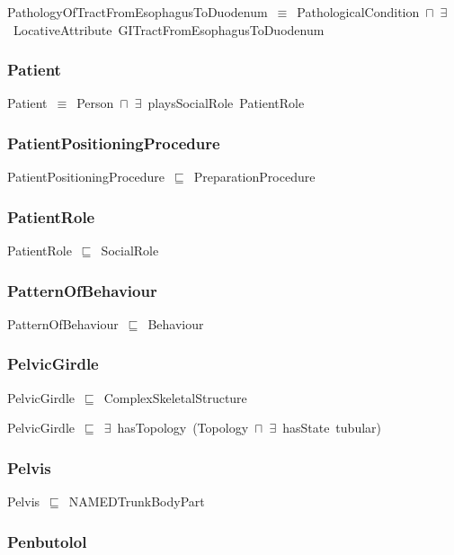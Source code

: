\documentclass{article}
\begin{document}
PathologyOfTractFromEsophagusToDuodenum~\ensuremath{\equiv}~PathologicalCondition~\ensuremath{\sqcap}~\ensuremath{\exists}~LocativeAttribute~GITractFromEsophagusToDuodenum

\subsubsection*{Patient}

Patient~\ensuremath{\equiv}~Person~\ensuremath{\sqcap}~\ensuremath{\exists}~playsSocialRole~PatientRole

\subsubsection*{PatientPositioningProcedure}

PatientPositioningProcedure~\ensuremath{\sqsubseteq}~PreparationProcedure~

\subsubsection*{PatientRole}

PatientRole~\ensuremath{\sqsubseteq}~SocialRole~

\subsubsection*{PatternOfBehaviour}

PatternOfBehaviour~\ensuremath{\sqsubseteq}~Behaviour~

\subsubsection*{PelvicGirdle}

PelvicGirdle~\ensuremath{\sqsubseteq}~ComplexSkeletalStructure~

PelvicGirdle~\ensuremath{\sqsubseteq}~\ensuremath{\exists}~hasTopology~(Topology~\ensuremath{\sqcap}~\ensuremath{\exists}~hasState~tubular)~

\subsubsection*{Pelvis}

Pelvis~\ensuremath{\sqsubseteq}~NAMEDTrunkBodyPart~

\subsubsection*{Penbutolol}
\end{document}
